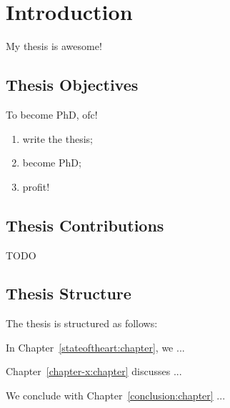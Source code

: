 
\chapter{Introduction}
\label{intro:chapter}

My thesis is awesome!

\section{Thesis Objectives}
\label{intro:objectives}

To become PhD, ofc!

\begin{enumerate}
	\item write the thesis;
	\item become PhD;
	\item profit!
\end{enumerate}


\section{Thesis Contributions}
\label{intro:contributions}

TODO

\section{Thesis Structure}
\label{intro:structure}

The thesis is structured as follows:

In Chapter~\ref{stateoftheart:chapter}, we ...

Chapter~\ref{chapter-x:chapter} discusses ...

We conclude with Chapter~\ref{conclusion:chapter} ...

